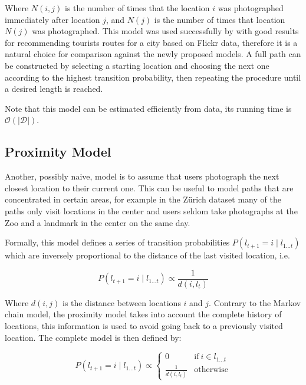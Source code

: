 Where $N(i,j)$ is the number of times that the location $i$ was photographed immediately after location $j$, and $N(j)$ is the number of times that location $N(j)$ was photographed. This model was used successfully by \citet{Kurashima2010} with good results for recommending tourists routes for a city based on Flickr data, therefore it is a natural choice for comparison against the newly proposed models. A full path can be constructed by selecting a starting location and choosing the next one according to the highest transition probability, then repeating the procedure until a desired length is reached.

Note that this model can be estimated efficiently from data, its running time is $\mathcal{O}(|\mathcal{D}|)$.

\subsection{Proximity Model}

Another, possibly naive, model is to assume that users photograph the next closest location to their current one. This can be useful to model paths that are concentrated in certain areas, for example in the Zürich dataset many of the paths only visit locations in the center and users seldom take photographs at the Zoo and a landmark in the center on the same day.

Formally, this model defines a series of transition probabilities $P(l_{t+1} = i \mid l_{1 \dots t})$ which are inversely proportional to the distance of the last visited location, i.e.

\begin{equation}
  P(l_{t+1} = i \mid l_{1 \dots t}) \propto \frac{1}{d(i, l_{t})}
\end{equation}

Where $d(i, j)$ is the distance between locations $i$ and $j$. Contrary to the Markov chain model, the proximity model takes into account the complete history of locations, this information is used to avoid going back to a previously visited location. The complete model is then defined by:

\begin{equation}
  \label{eq:proximity}
  P(l_{t+1} = i \mid l_{1 \dots t}) \propto \begin{cases}
    0 & \text{if}\ i \in l_{1 \dots t} \\
    \frac{1}{d(i, l_{t})} & \text{otherwise}
  \end{cases}
\end{equation}

